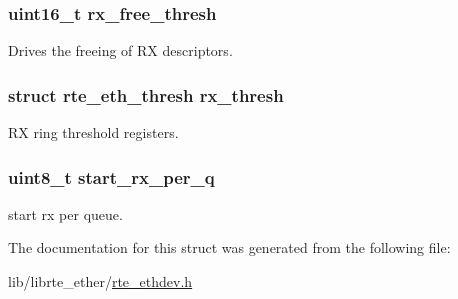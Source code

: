 \subsubsection[{rx\+\_\+free\+\_\+thresh}]{\setlength{\rightskip}{0pt plus 5cm}uint16\+\_\+t rx\+\_\+free\+\_\+thresh}\label{structrte__eth__rxconf_afb96f8601653c049cf230aee1cc6a5ce}
Drives the freeing of R\+X descriptors. \hypertarget{structrte__eth__rxconf_a54f23ee5a28d183c8d6760f80944f2a2}{}
\subsubsection[{rx\+\_\+thresh}]{\setlength{\rightskip}{0pt plus 5cm}struct {\bf rte\+\_\+eth\+\_\+thresh} rx\+\_\+thresh}\label{structrte__eth__rxconf_a54f23ee5a28d183c8d6760f80944f2a2}
R\+X ring threshold registers. \hypertarget{structrte__eth__rxconf_a8f2a0aa8ea1c433bdf44d467af90582f}{}
\subsubsection[{start\+\_\+rx\+\_\+per\+\_\+q}]{\setlength{\rightskip}{0pt plus 5cm}uint8\+\_\+t start\+\_\+rx\+\_\+per\+\_\+q}\label{structrte__eth__rxconf_a8f2a0aa8ea1c433bdf44d467af90582f}
start rx per queue. 

The documentation for this struct was generated from the following file\+:\begin{DoxyCompactItemize}
\item 
lib/librte\+\_\+ether/\hyperlink{rte__ethdev_8h}{rte\+\_\+ethdev.\+h}\end{DoxyCompactItemize}
